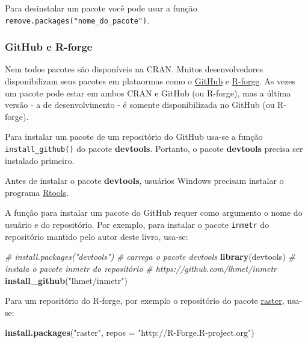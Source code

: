 \documentclass[]{book}
\newenvironment{Shaded}{\begin{snugshade}}{\end{snugshade}}
\newcommand{\KeywordTok}[1]{\textcolor[rgb]{0.13,0.29,0.53}{\textbf{#1}}}
\newcommand{\DataTypeTok}[1]{\textcolor[rgb]{0.13,0.29,0.53}{#1}}
\newcommand{\StringTok}[1]{\textcolor[rgb]{0.31,0.60,0.02}{#1}}
\newcommand{\CommentTok}[1]{\textcolor[rgb]{0.56,0.35,0.01}{\textit{#1}}}
\newcommand{\NormalTok}[1]{#1}
\begin{document}
Para desinstalar um pacote você pode usar a função
\texttt{remove.packages("nome\_do\_pacote")}.

\subsubsection{GitHub e R-forge}\label{github-e-r-forge}

Nem todos pacotes são disponíveis na CRAN. Muitos desenvolvedores
disponibilizam seus pacotes em plataormas como o
\href{https://github.com/}{GitHub} e
\href{https://r-forge.r-project.org/}{R-forge}. As vezes um pacote pode
estar em ambos CRAN e GitHub (ou R-forge), mas a última versão - a de
desenvolvimento - é somente disponibilizada no GitHub (ou R-forge).

Para instalar um pacote de um repositório do GitHub usa-se a função
\texttt{install\_github()} do pacote \textbf{devtools}. Portanto, o
pacote \textbf{devtools} precisa ser instalado primeiro.

Antes de instalar o pacote \textbf{devtools}, usuários Windows precisam
instalar o programa
\href{https://cran.r-project.org/bin/windows/Rtools/index.html}{Rtools}.

A função para instalar um pacote do GitHub requer como argumento o nome
do usuário e do repositório. Por exemplo, para instalar o pacote
\texttt{inmetr} do repositório mantido pelo autor deste livro, usa-se:

\begin{Shaded}
\begin{Highlighting}[]
\CommentTok{# install.packages("devtools")}
\CommentTok{# carrega o pacote devtools}
\KeywordTok{library}\NormalTok{(devtools)}
\CommentTok{# instala o pacote inmetr do repositório }
\CommentTok{# https://github.com/lhmet/inmetr }
\KeywordTok{install_github}\NormalTok{(}\StringTok{"lhmet/inmetr"}\NormalTok{)}
\end{Highlighting}
\end{Shaded}

Para um repositório do R-forge, por exemplo o repositório do pacote
\href{https://r-forge.r-project.org/projects/raster/}{raster}, usa-se:

\begin{Shaded}
\begin{Highlighting}[]
\KeywordTok{install.packages}\NormalTok{(}\StringTok{"raster"}\NormalTok{, }\DataTypeTok{repos =} \StringTok{"http://R-Forge.R-project.org"}\NormalTok{)}
\end{Highlighting}
\end{Shaded}
\end{document}
